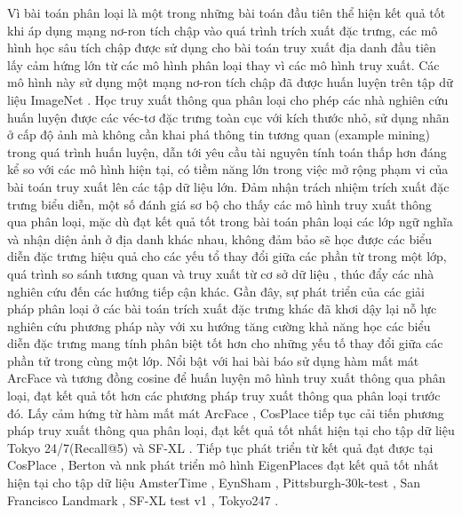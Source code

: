 Vì bài toán phân loại là một trong những bài toán đầu tiên thể hiện kết quả tốt khi áp dụng mạng nơ-ron tích chập vào quá trình trích xuất đặc trưng, các mô hình học sâu tích chập được sử dụng cho bài toán truy xuất địa danh đầu tiên lấy cảm hứng lớn từ các mô hình phân loại thay vì các mô hình truy xuất. Các mô hình này sử dụng một mạng nơ-ron tích chập đã được huấn luyện trên tập dữ liệu ImageNet \cite{krizhevsky2012imagenet}. Học truy xuất thông qua phân loại cho phép các nhà nghiên cứu huấn luyện được các véc-tơ đặc trưng toàn cục với kích thước nhỏ, sử dụng nhãn ở cấp độ ảnh mà không cần khai phá thông tin tương quan (example mining) trong quá trình huấn luyện, dẫn tới yêu cầu tài nguyên tính toán thấp hơn đáng kể so với các mô hình hiện tại, có tiềm năng lớn trong việc mở rộng phạm vi của bài toán truy xuất lên các tập dữ liệu lớn. Đảm nhận trách nhiệm trích xuất đặc trưng biểu diễn, một số đánh giá sơ bộ cho thấy các mô hình truy xuất thông qua phân loại, mặc dù đạt kết quả tốt trong bài toán phân loại các lớp ngữ nghĩa và nhận diện ảnh ở địa danh khác nhau, không đảm bảo sẽ học được các biểu diễn đặc trưng hiệu quả cho các yếu tổ thay đổi giữa các phần từ trong một lớp, quá trình so sánh tương quan và truy xuất từ cơ sở dữ liệu \cite{arandjelovic2016netvlad, gordo2016deep, randenovic2016BoW}, thúc đẩy các nhà nghiên cứu đến các hướng tiếp cận khác. Gần đây, sự phát triển của các giải pháp phân loại ở các bài toán trích xuất đặc trưng khác đã khơi dậy lại nỗ lực nghiên cứu phương pháp này với xu hướng tăng cường khả năng học các biểu diễn đặc trưng mang tính phân biệt tốt hơn cho những yếu tố thay đổi giữa các phần tử trong cùng một lớp. Nổi bật với hai bài báo \cite{cao2020unifying, yokoo2020twostage} sử dụng hàm mất mát ArcFace \cite{Deng_2022} và tương đồng cosine để huấn luyện mô hình truy xuất thông qua phân loại, đạt kết quả tốt hơn các phương pháp truy xuất thông qua phân loại trước đó. Lấy cảm hứng từ hàm mất mát ArcFace \cite{Deng_2022}, CosPlace \cite{berton2022rethinking} tiếp tục cải tiến phương pháp truy xuất thông qua phân loại, đạt kết quả tốt nhất hiện tại cho tập dữ liệu Tokyo 24/7(Recall@5) \cite{Torii-CVPR2015} và SF-XL \cite{berton2022rethinking}. Tiếp tục phát triển từ kết quả đạt được tại CosPlace \cite{berton2022rethinking}, Berton và nnk phát triển mô hình EigenPlaces \cite{berton2023eigenplaces} đạt kết quả tốt nhất hiện tại cho tập dữ liệu AmsterTime \cite{yildiz2022amstertime}, EynSham \cite{eynsham2009}, Pittsburgh-30k-test \cite{6618963}, San Francisco Landmark \cite{5995610}, SF-XL test v1 \cite{berton2022rethinking}, Tokyo247 \cite{Torii-CVPR2015}.

